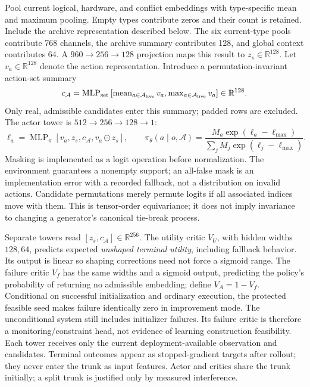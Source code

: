 Pool current logical, hardware, and conflict embeddings with type-specific mean and maximum pooling. Empty types contribute zeros and their count is retained. Include the archive representation described below. The six current-type pools contribute 768 channels, the archive summary contributes 128, and global context contributes 64. A \(960\to256\to128\) projection maps this result to \(z_s\in\mathbb R^{128}\). Let \(v_a\in\mathbb R^{128}\) denote the action representation. Introduce a permutation-invariant action-set summary
\[
 c_{\mathcal A}=\operatorname{MLP}_{\rm set}
 \left[\operatorname{mean}_{a\in\mathcal A_{\rm live}}v_a,
       \operatorname{max}_{a\in\mathcal A_{\rm live}}v_a\right]
 \in\mathbb R^{128}.
\]
Only real, admissible candidates enter this summary; padded rows are excluded. The actor tower is \(512\to256\to128\to1\):
\[
 \ell_a=\operatorname{MLP}_\pi
 [v_a,z_s,c_{\mathcal A},v_a\odot z_s],\qquad
 \pi_\theta(a\mid o,\mathcal A)=
 \frac{M_a\exp(\ell_a-\ell_{\max})}
 {\sum_j M_j\exp(\ell_j-\ell_{\max})}.
\]
Masking is implemented as a logit operation before normalization. The environment guarantees a nonempty support; an all-false mask is an implementation error with a recorded fallback, not a distribution on invalid actions. Candidate permutations merely permute logits if all associated indices move with them. This is tensor-order equivariance; it does not imply invariance to changing a generator's canonical tie-break process.

Separate towers read \([z_s,c_{\mathcal A}]\in\mathbb R^{256}\). The utility critic \(V_U\), with hidden widths \(128,64\), predicts expected \emph{unshaped terminal utility}, including fallback behavior. Its output is linear so shaping corrections need not force a sigmoid range. The failure critic \(V_f\) has the same widths and a sigmoid output, predicting the policy's probability of returning no admissible embedding; define \(V_A=1-V_f\). Conditional on successful initialization and ordinary execution, the protected feasible seed makes failure identically zero in improvement mode. The unconditional system still includes initializer failures. Its failure critic is therefore a monitoring/constraint head, not evidence of learning construction feasibility. Each tower receives only the current deployment-available observation and candidates. Terminal outcomes appear as stopped-gradient targets after rollout; they never enter the trunk as input features. Actor and critics share the trunk initially; a split trunk is justified only by measured interference.

